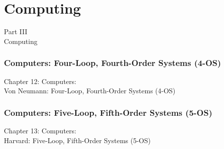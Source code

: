 \documentclass[aspectratio=169,11pt]{beamer}
\begin{document}
\part{Computing}

\begin{frame}
\begin{center}
{\Huge Part III}\\[0.5cm]
{\Large Computing}\\[0.5cm]
\end{center}
\end{frame}


\section{Computers: Four-Loop, Fourth-Order Systems (4-OS)}

\begin{frame}
\begin{center}
{\Huge Chapter 12: Computers:}\\[0.5cm]
{\Large Von Neumann: Four-Loop, Fourth-Order Systems (4-OS)}\\[0.5cm]
\end{center}
\end{frame}



\section{Computers: Five-Loop, Fifth-Order Systems (5-OS)}

\begin{frame}
\begin{center}
{\Huge Chapter 13: Computers:}\\[0.5cm]
{\Large Harvard:  Five-Loop, Fifth-Order Systems (5-OS)}\\[0.5cm]
\end{center}
\end{frame}



\end{document}
